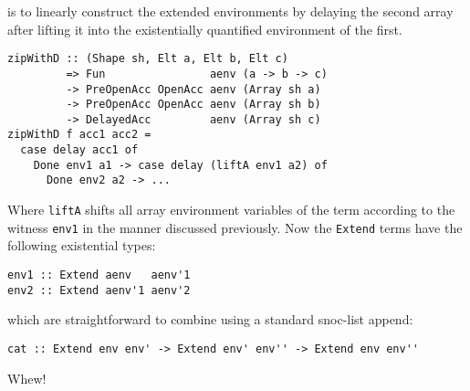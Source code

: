 is to linearly construct the extended environments by delaying the second array
after lifting it into the existentially quantified environment of the first.
%
\begin{lstlisting}[style=haskell]
zipWithD :: (Shape sh, Elt a, Elt b, Elt c)
         => Fun                aenv (a -> b -> c)
         -> PreOpenAcc OpenAcc aenv (Array sh a)
         -> PreOpenAcc OpenAcc aenv (Array sh b)
         -> DelayedAcc         aenv (Array sh c)
zipWithD f acc1 acc2 =
  case delay acc1 of
    Done env1 a1 -> case delay (liftA env1 a2) of
      Done env2 a2 -> ...
\end{lstlisting}
%
Where \texttt{liftA} shifts all array environment variables of the term
according to the witness \texttt{env1} in the manner discussed previously. Now
the \texttt{Extend} terms have the following existential types:
%
\begin{lstlisting}[style=haskell]
env1 :: Extend aenv   aenv'1
env2 :: Extend aenv'1 aenv'2
\end{lstlisting}
%
which are straightforward to combine using a standard snoc-list append:
%
\begin{lstlisting}[style=haskell]
cat :: Extend env env' -> Extend env' env'' -> Extend env env''
\end{lstlisting}
%
Whew!



\endinput

\section{The Transformations Interacting}

This section follows a few examples to discuss the effect of applying the
transformations described in the preceding sections. Many of these motivating
examples have shown up in real applications. The effects usually involve a
combination of many transformations and so give an idea of how the
transformations interact with one another.

\subsection{Repeated Evaluations}
\subsection{Confluence and Termination}

